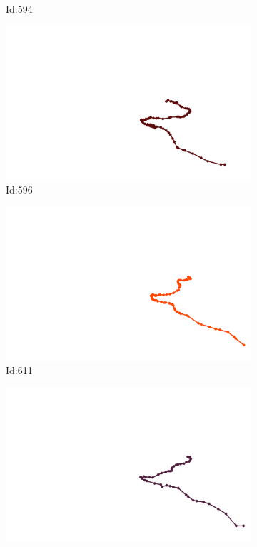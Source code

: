 \documentclass[12pt,twoside]{report}
\begin{document}
\begin{figure}
\begin{subfigure}[b]{0.20\textwidth}
\caption{Id:594}
\end{subfigure}
\begin{subfigure}[b]{0.20\textwidth}
\centering
\includegraphics[width=\textwidth]{../trajectories/596.png}
\caption{Id:596}
\end{subfigure}
\begin{subfigure}[b]{0.20\textwidth}
\centering
\includegraphics[width=\textwidth]{../trajectories/611.png}
\caption{Id:611}
\end{subfigure}
\begin{subfigure}[b]{0.20\textwidth}
\centering
\includegraphics[width=\textwidth]{../trajectories/634.png}

\end{subfigure}
\end{figure}
\end{document}
